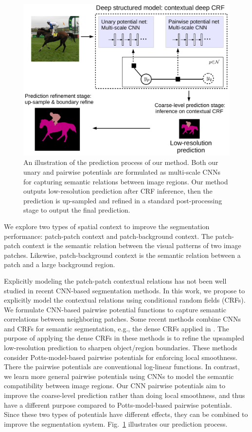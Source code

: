 \begin{figure}[t]
	\centering
	\includegraphics[width=.95\linewidth]{./figs/general_graph}
\caption{An illustration of the prediction process of our method.
Both our unary and pairwise potentials are formulated as multi-scale CNNs for capturing semantic relations between image regions.
Our method outputs low-resolution prediction after CRF inference, then the prediction is up-sampled and refined in a standard post-processing stage to output the final prediction.}
\label{fig:general_graph}
\end{figure}




We explore two types of spatial context to improve the segmentation performance: patch-patch context and patch-background context.
The patch-patch context is the semantic relation between the visual patterns of two image patches. Likewise,
patch-background context is the semantic relation between a patch and a large background region.




Explicitly modeling the patch-patch contextual relations has not been well studied in recent CNN-based segmentation methods.
In this work, we propose to explicitly model the contextual relations using conditional random fields (CRFs).
We formulate CNN-based pairwise potential functions to capture semantic correlations between neighboring patches.
Some recent methods  combine CNNs and CRFs for semantic segmentation,
e.g., the dense CRFs applied in \cite{ChenPKMY14,schwing2015fully,zheng2015conditional,Dai2015arXiv}.
The purpose of applying the dense CRFs in these methods is to refine the upsampled low-resolution prediction to sharpen object/region boundaries.
These methods consider Potts-model-based pairwise potentials for enforcing local smoothness.
There the pairwise potentials are conventional log-linear functions.
In contrast, we
learn more general pairwise potentials using CNNs to model the semantic compatibility between image regions.
Our CNN pairwise potentials aim to improve the coarse-level prediction rather than doing local smoothness, 
and thus have a different purpose compared to Potts-model-based pairwise potentials.
Since these two types of potentials have different effects, they can be combined to improve the segmentation system.
Fig.~\ref{fig:general_graph} illustrates our prediction process.




